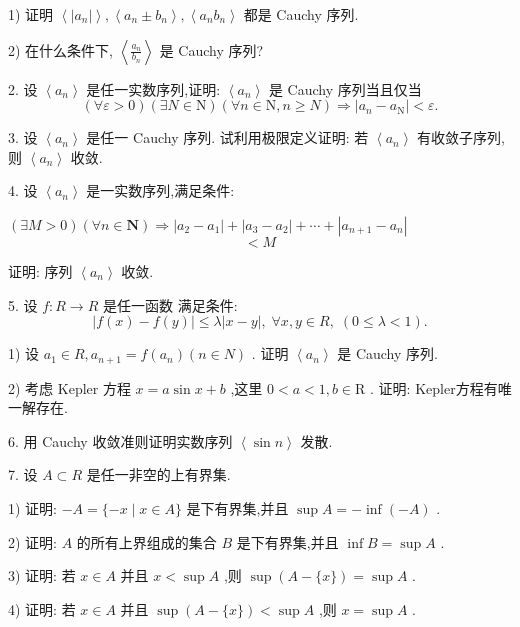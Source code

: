 1) 证明 $\left\langle  \left| {a}_{n}\right| \right\rangle  ,\left\langle  {{a}_{n} \pm  {b}_{n}}\right\rangle  ,\left\langle  {{a}_{n}{b}_{n}}\right\rangle$ 都是 Cauchy 序列.

2) 在什么条件下, $\left\langle  \frac{{a}_{n}}{{b}_{n}}\right\rangle$ 是 Cauchy 序列?

2. 设 $\left\langle  {a}_{n}\right\rangle$ 是任一实数序列,证明: $\left\langle  {a}_{n}\right\rangle$ 是 Cauchy 序列当且仅当
$$\left( {\forall \varepsilon  > 0}\right) \left( {\exists N \in  \mathrm{N}}\right) \left( {\forall n \in  \mathrm{N},n \geq  N}\right)  \Rightarrow  \left| {{a}_{n} - {a}_{\mathrm{N}}}\right|  < \varepsilon .$$

3. 设 $\left\langle  {a}_{n}\right\rangle$ 是任一 Cauchy 序列. 试利用极限定义证明: 若 $\left\langle  {a}_{n}\right\rangle$ 有收敛子序列,则 $\left\langle  {a}_{n}\right\rangle$ 收敛.

4. 设 $\left\langle  {a}_{n}\right\rangle$ 是一实数序列,满足条件:

$\left( {\exists M > 0}\right) \left( {\forall n \in  \mathbf{N}}\right)  \Rightarrow  \left| {{a}_{2} - {a}_{1}}\right|  + \left| {{a}_{3} - {a}_{2}}\right|  + \cdots  + \left| {{a}_{n + 1} - {a}_{n}}\right|$
$$< M$$

证明: 序列 $\left\langle  {a}_{n}\right\rangle$ 收敛.

5. 设 $f : R \rightarrow  R$ 是任一函数 满足条件:
$$\left| {f\left( x\right)  - f\left( y\right) }\right|  \leq  \lambda \left| {x - y}\right| ,\;\forall x,y \in  R,\;\left( {0 \leq  \lambda  < 1}\right) .$$

1) 设 ${a}_{1} \in  R,{a}_{n + 1} = f\left( {a}_{n}\right) \left( {n \in  N}\right)$ . 证明 $\left\langle  {a}_{n}\right\rangle$ 是 Cauchy 序列.

2) 考虑 Kepler 方程 $x = a\sin x + b$ ,这里 $0 < a < 1,b \in  \mathrm{R}$ . 证明: Kepler方程有唯一解存在.

6. 用 Cauchy 收敛准则证明实数序列 $\left\langle  {\sin n}\right\rangle$ 发散.

7. 设 $A \subset  R$ 是任一非空的上有界集.

1) 证明: $- A = \{  - x \mid  x \in  A\}$ 是下有界集,并且 $\sup A =  - \inf \left( {-A}\right)$ .

2) 证明: $A$ 的所有上界组成的集合 $B$ 是下有界集,并且 $\inf B = \sup A$ .

3) 证明: 若 $x \in  A$ 并且 $x < \sup A$ ,则 $\sup \left( {A-\{ x\} }\right)  = \sup A$ .

4) 证明: 若 $x \in  A$ 并且 $\sup \left( {A-\{ x\} }\right)  < \sup A$ ,则 $x = \sup A$ .

